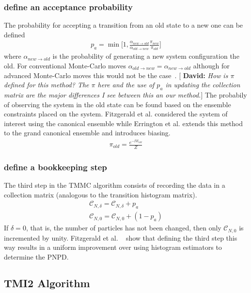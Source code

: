 \documentclass[letterpaper,twocolumn,amsmath,amssymb,pre,aps,10pt]{revtex4-1}
\newcommand{\green}[1]{{\bf \color{green} #1}}
\newcommand{\davidsays}[1]{{\color{red} [\green{David:} \emph{#1}]}}
\begin{document}
\subsubsection{define an acceptance probability}
The probability for accepting a transition from an old state to a new one can be 
defined
\begin{align}
  p_{a} = \min\bigg[1,\frac{\alpha_{new\rightarrow old}}
  {\alpha_{old \rightarrow new}}\frac{\pi_{new}}{\pi_{old}}\bigg]
\end{align}
where $\alpha_{new\rightarrow old}$ is the probability of generating a new system 
configuration the old.  For conventional Monte-Carlo moves $\alpha_{old \rightarrow new}
=\alpha_{new\rightarrow old}$ although for advanced Monte-Carlo moves this would not 
be the case~\cite{paluch2008comparing, siepmann1990method}.
\davidsays{How is $\pi$ defined for this method? The $\pi$ here and
  the use of $p_a$ in updating the collection matrix are the major
  differences I see between this an our method.}
The probabily of observing the system in the old state can be found based on the 
ensemble constraints placed on the system.  Fitzgerald et al. considered the system of
interest using the canonical ensemble while Errington et al. extends this method to the
grand canonical ensemble and introduces biasing.
\begin{align}
  \pi_{old} = \frac{e^{-\beta E_{old}}}{Z}
\end{align}

\subsubsection{define a bookkeeping step}
The third step in the TMMC algorithm consists of recording the data in a collection 
matrix (analogous to the transition histogram matrix).
\begin{align}
  \mathcal{C}_{N,\delta} = \mathcal{C}_{N,\delta} + p_{a}\\
  \mathcal{C}_{N,0} = \mathcal{C}_{N,0} +(1 - p_{a})
\end{align}  
If $\delta=0$, that is, the number of particles has not been changed, then only 
$\mathcal{C}_{N,0}$ is incremented by unity. Fitzgerald et al. ~\cite{fitzgerald2000monte}
show that defining the third step this way results in a uniform improvement over 
using histogram estimators to determine the PNPD.

\subsection{TMI2 Algorithm}
\end{document}
